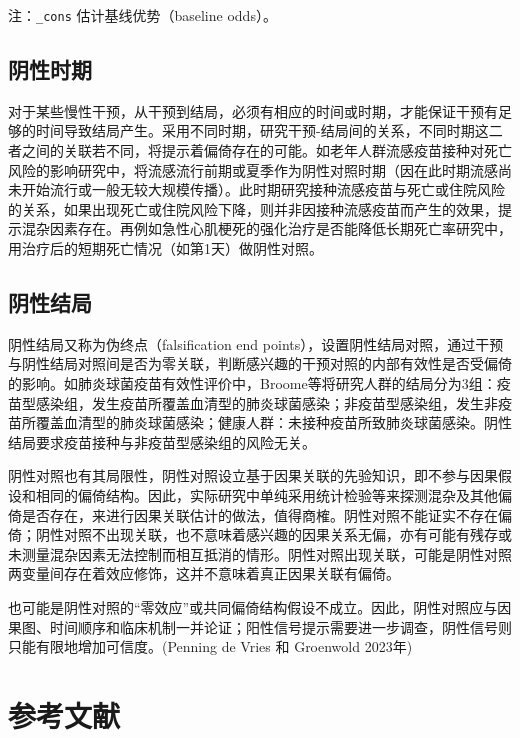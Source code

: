 \documentclass[
  chinese-hans,
  letterpaper,
  DIV=11,
  numbers=noendperiod]{scrreprt}
\begin{document}
\begin{tcolorbox}[enhanced jigsaw, arc=.35mm, bottomrule=.15mm, breakable, colback=white, colframe=quarto-callout-note-color-frame, left=2mm, leftrule=.75mm, opacityback=0, rightrule=.15mm, toprule=.15mm]
注：\texttt{\_cons} 估计基线优势（baseline odds）。

\end{tcolorbox}

\subsection{阴性时期}\label{ux9634ux6027ux65f6ux671f}

对于某些慢性干预，从干预到结局，必须有相应的时间或时期，才能保证干预有足够的时间导致结局产生。采用不同时期，研究干预-结局间的关系，不同时期这二者之间的关联若不同，将提示着偏倚存在的可能。如老年人群流感疫苗接种对死亡风险的影响研究中，将流感流行前期或夏季作为阴性对照时期（因在此时期流感尚未开始流行或一般无较大规模传播）。此时期研究接种流感疫苗与死亡或住院风险的关系，如果出现死亡或住院风险下降，则并非因接种流感疫苗而产生的效果，提示混杂因素存在。再例如急性心肌梗死的强化治疗是否能降低长期死亡率研究中，用治疗后的短期死亡情况（如第1天）做阴性对照。

\subsection{阴性结局}\label{ux9634ux6027ux7ed3ux5c40}

阴性结局又称为伪终点（falsification end
points），设置阴性结局对照，通过干预与阴性结局对照间是否为零关联，判断感兴趣的干预对照的内部有效性是否受偏倚的影响。如肺炎球菌疫苗有效性评价中，Broome等将研究人群的结局分为3组：疫苗型感染组，发生疫苗所覆盖血清型的肺炎球菌感染；非疫苗型感染组，发生非疫苗所覆盖血清型的肺炎球菌感染；健康人群：未接种疫苗所致肺炎球菌感染。阴性结局要求疫苗接种与非疫苗型感染组的风险无关。

阴性对照也有其局限性，阴性对照设立基于因果关联的先验知识，即不参与因果假设和相同的偏倚结构。因此，实际研究中单纯采用统计检验等来探测混杂及其他偏倚是否存在，来进行因果关联估计的做法，值得商榷。阴性对照不能证实不存在偏倚；阴性对照不出现关联，也不意味着感兴趣的因果关系无偏，亦有可能有残存或未测量混杂因素无法控制而相互抵消的情形。阴性对照出现关联，可能是阴性对照两变量间存在着效应修饰，这并不意味着真正因果关联有偏倚。

也可能是阴性对照的``零效应''或共同偏倚结构假设不成立。因此，阴性对照应与因果图、时间顺序和临床机制一并论证；阳性信号提示需要进一步调查，阴性信号则只能有限地增加可信度。(Penning
de Vries 和 Groenwold 2023年)

\section*{参考文献}\label{ux53c2ux8003ux6587ux732e-8}
\end{document}
